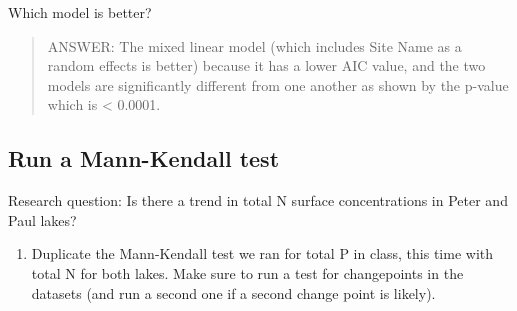\documentclass[]{article}
\newenvironment{Shaded}{\begin{snugshade}}{\end{snugshade}}
\newcommand{\KeywordTok}[1]{\textcolor[rgb]{0.13,0.29,0.53}{\textbf{#1}}}
\newcommand{\DecValTok}[1]{\textcolor[rgb]{0.00,0.00,0.81}{#1}}
\newcommand{\StringTok}[1]{\textcolor[rgb]{0.31,0.60,0.02}{#1}}
\newcommand{\CommentTok}[1]{\textcolor[rgb]{0.56,0.35,0.01}{\textit{#1}}}
\newcommand{\OperatorTok}[1]{\textcolor[rgb]{0.81,0.36,0.00}{\textbf{#1}}}
\newcommand{\NormalTok}[1]{#1}
\providecommand{\tightlist}{%
  \setlength{\itemsep}{0pt}\setlength{\parskip}{0pt}}
\begin{document}
Which model is better?

\begin{quote}
ANSWER: The mixed linear model (which includes Site Name as a random
effects is better) because it has a lower AIC value, and the two models
are significantly different from one another as shown by the p-value
which is \textless{} 0.0001.
\end{quote}

\subsection{Run a Mann-Kendall test}\label{run-a-mann-kendall-test}

Research question: Is there a trend in total N surface concentrations in
Peter and Paul lakes?

\begin{enumerate}
\def\labelenumi{\arabic{enumi}.}
\setcounter{enumi}{3}
\tightlist
\item
  Duplicate the Mann-Kendall test we ran for total P in class, this time
  with total N for both lakes. Make sure to run a test for changepoints
  in the datasets (and run a second one if a second change point is
  likely).
\end{enumerate}

\begin{Shaded}
\end{Shaded}
\end{document}
